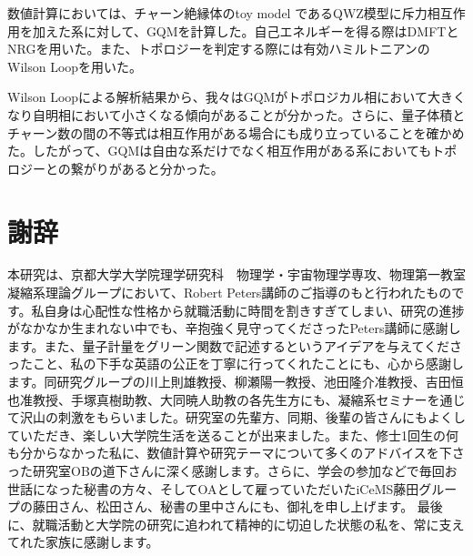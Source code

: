 \documentclass[12pt]{jsbook}
\begin{document}
数値計算においては、チャーン絶縁体のtoy model であるQWZ模型に斥力相互作用を加えた系に対して、GQMを計算した。自己エネルギーを得る際はDMFTとNRGを用いた。また、トポロジーを判定する際には有効ハミルトニアンのWilson Loopを用いた。

Wilson Loopによる解析結果から、我々はGQMがトポロジカル相において大きくなり自明相において小さくなる傾向があることが分かった。さらに、量子体積とチャーン数の間の不等式は相互作用がある場合にも成り立っていることを確かめた。したがって、GQMは自由な系だけでなく相互作用がある系においてもトポロジーとの繋がりがあると分かった。
\chapter*{謝辞}
本研究は、京都大学大学院理学研究科　物理学・宇宙物理学専攻、物理第一教室　凝縮系理論グループにおいて、Robert Peters講師のご指導のもと行われたものです。私自身は心配性な性格から就職活動に時間を割きすぎてしまい、研究の進捗がなかなか生まれない中でも、辛抱強く見守ってくださったPeters講師に感謝します。また、量子計量をグリーン関数で記述するというアイデアを与えてくださったこと、私の下手な英語の公正を丁寧に行ってくれたことにも、心から感謝します。同研究グループの川上則雄教授、柳瀬陽一教授、池田隆介准教授、吉田恒也准教授、手塚真樹助教、大同暁人助教の各先生方にも、凝縮系セミナーを通じて沢山の刺激をもらいました。研究室の先輩方、同期、後輩の皆さんにもよくしていただき、楽しい大学院生活を送ることが出来ました。また、修士1回生の何も分からなかった私に、数値計算や研究テーマについて多くのアドバイスを下さった研究室OBの道下さんに深く感謝します。さらに、学会の参加などで毎回お世話になった秘書の方々、そしてOAとして雇っていただいたiCeMS藤田グループの藤田さん、松田さん、秘書の里中さんにも、御礼を申し上げます。
最後に、就職活動と大学院の研究に追われて精神的に切迫した状態の私を、常に支えてれた家族に感謝します。

\end{document}

